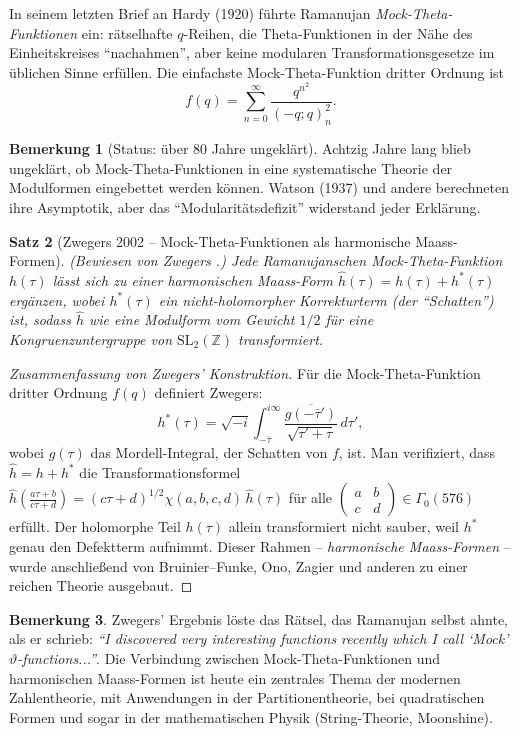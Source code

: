 \documentclass[12pt,a4paper]{amsart}
\newtheorem{theorem}{Satz}[section]
\theoremstyle{definition}
\newtheorem{remark}[theorem]{Bemerkung}
\begin{document}
In seinem letzten Brief an Hardy (1920) führte Ramanujan
\emph{Mock-Theta-Funktionen} ein: rätselhafte $q$-Reihen, die Theta-Funktionen
in der Nähe des Einheitskreises ``nachahmen'', aber keine modularen Transformationsgesetze
im üblichen Sinne erfüllen.
Die einfachste Mock-Theta-Funktion dritter Ordnung ist
\[
  f(q) = \sum_{n=0}^{\infty} \frac{q^{n^2}}{(-q;q)_n^2}.
\]

\begin{remark}[Status: über 80 Jahre ungeklärt]
Achtzig Jahre lang blieb ungeklärt, ob Mock-Theta-Funktionen in eine systematische
Theorie der Modulformen eingebettet werden können.
Watson (1937) und andere berechneten ihre Asymptotik, aber das
``Modularitätsdefizit'' widerstand jeder Erklärung.
\end{remark}

\begin{theorem}[Zwegers 2002 -- Mock-Theta-Funktionen als harmonische Maass-Formen]\label{thm:zwegers}
\textup{(Bewiesen von Zwegers \cite{Zwegers2002}.)}
Jede Ramanujanschen Mock-Theta-Funktion $h(\tau)$ lässt sich zu einer
\emph{harmonischen Maass-Form} $\widehat{h}(\tau) = h(\tau) + h^*(\tau)$ ergänzen,
wobei $h^*(\tau)$ ein nicht-holomorpher Korrekturterm (der ``Schatten'') ist,
sodass $\widehat{h}$ wie eine Modulform vom Gewicht $1/2$
für eine Kongruenzuntergruppe von $\mathrm{SL}_2(\mathbb{Z})$ transformiert.
\end{theorem}

\begin{proof}[Zusammenfassung von Zwegers' Konstruktion]
Für die Mock-Theta-Funktion dritter Ordnung $f(q)$ definiert Zwegers:
\[
  h^*(\tau) = \sqrt{-i}\int_{-\bar\tau}^{i\infty}
  \frac{\overline{g(-\bar\tau')}}{\sqrt{\tau'+\tau}}\,d\tau',
\]
wobei $g(\tau)$ das Mordell-Integral, der Schatten von $f$, ist.
Man verifiziert, dass $\widehat{h} = h + h^*$ die Transformationsformel
$\widehat{h}\!\left(\frac{a\tau+b}{c\tau+d}\right) = (c\tau+d)^{1/2}\chi(a,b,c,d)\,\widehat{h}(\tau)$
für alle $\begin{pmatrix}a&b\\c&d\end{pmatrix}\in\Gamma_0(576)$ erfüllt.
Der holomorphe Teil $h(\tau)$ allein transformiert nicht sauber, weil $h^*$
genau den Defektterm aufnimmt.
Dieser Rahmen -- \emph{harmonische Maass-Formen} -- wurde anschließend von
Bruinier--Funke, Ono, Zagier und anderen zu einer reichen Theorie ausgebaut.
\end{proof}

\begin{remark}
Zwegers' Ergebnis löste das Rätsel, das Ramanujan selbst ahnte, als er schrieb:
\textit{``I discovered very interesting functions recently which I call `Mock' $\vartheta$-functions...''}.
Die Verbindung zwischen Mock-Theta-Funktionen und harmonischen Maass-Formen ist heute
ein zentrales Thema der modernen Zahlentheorie, mit Anwendungen in der Partitionentheorie,
bei quadratischen Formen und sogar in der mathematischen Physik (String-Theorie, Moonshine).
\end{remark}
\end{document}
